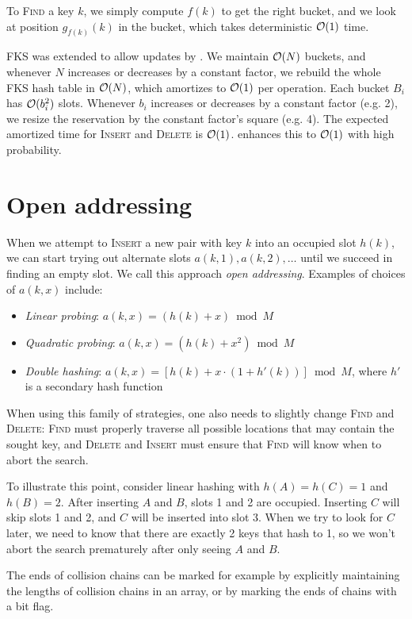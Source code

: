To \textsc{Find} a key $k$, we simply compute $f(k)$ to get the right bucket,
and we look at position $g_{f(k)}(k)$ in the bucket, which takes deterministic
$\mathcal{O}(1)$ time.

FKS was extended to allow updates by \cite{dyn-ph-bounds}.
We maintain $\mathcal{O}(N)$ buckets, and whenever $N$ increases or decreases by
a constant factor, we rebuild the whole FKS hash table in $\mathcal{O}(N)$, which
amortizes to $\mathcal{O}(1)$ per operation. Each bucket $B_i$ has $\mathcal{O}(b_i^2)$ slots.
Whenever $b_i$ increases or decreases by a constant factor (e.g. 2), we resize
the reservation by the constant factor's square (e.g. 4).
The expected amortized time for \textsc{Insert} and \textsc{Delete} is $\mathcal{O}(1)$.
\cite{univ-class-of-hfns} enhances this to $\mathcal{O}(1)$ with high probability.

\section{Open addressing}
\label{sec:open-addressing}
When we attempt to \textsc{Insert} a new pair with key $k$ into an occupied slot
$h(k)$, we can start trying out alternate slots $a(k,1), a(k,2), \ldots$
until we succeed in finding an empty slot. We call this approach \emph{open
addressing}. Examples of choices of $a(k,x)$ include:
\begin{itemize}
\item \emph{Linear probing}: $a(k,x)=(h(k)+x) \bmod M$
\item \emph{Quadratic probing}: $a(k,x)=(h(k)+x^2) \bmod M$
\item \emph{Double hashing}: $a(k,x)=[h(k)+x\cdot (1+h'(k))]\bmod M$, where
$h'$ is a secondary hash function
\end{itemize}

When using this family of strategies, one also needs to slightly change
\textsc{Find} and \textsc{Delete}: \textsc{Find} must properly traverse
all possible locations that may contain the sought key, and \textsc{Delete}
and \textsc{Insert} must ensure that \textsc{Find} will know when to abort
the search.

To illustrate this point, consider linear hashing with $h(A)=h(C)=1$ and
$h(B)=2$. After inserting $A$ and $B$, slots 1 and 2 are occupied.
Inserting $C$ will skip slots 1 and 2, and $C$ will be inserted into slot 3.
When we try to look for $C$ later, we need to know that there are exactly 2 keys
that hash to 1, so we won't abort the search prematurely after only seeing
$A$ and $B$.

The ends of collision chains can be marked for example by explicitly maintaining
the lengths of collision chains in an array, or by marking the ends of chains
with a bit flag.

